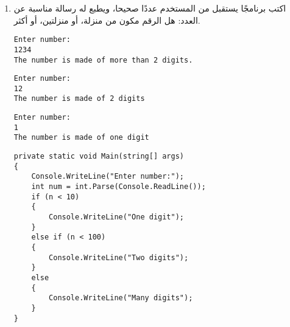 \documentclass[12pt, twoside]{article}
\begin{document}
\begin{enumerate}[itemsep=3em]
\begin{enumerate}
\item اكتب برنامجًا يستقبل من المستخدم عددًا صحيحا، ويطبع له رسالة مناسبة عن العدد: هل الرقم مكون من منزلة، أو منزلتين، أو أكثر.
\ifdetailed
\begin{boxExample}[1]
\begin{english}
\begin{verbatim}
Enter number:
1234
The number is made of more than 2 digits.
\end{verbatim}
\end{english}
\end{boxExample}
\begin{boxExample}[2]
\begin{english}
\begin{verbatim}
Enter number:
12
The number is made of 2 digits
\end{verbatim}
\end{english}
\end{boxExample}
\begin{boxExample}[3]
\begin{english}
\begin{verbatim}
Enter number:
1
The number is made of one digit
\end{verbatim}
\end{english}
\end{boxExample}

\ifwithsols
\begin{boxSolution}
\begin{english}
\begin{verbatim}
private static void Main(string[] args)
{
    Console.WriteLine("Enter number:");
    int num = int.Parse(Console.ReadLine());
    if (n < 10)
    {
        Console.WriteLine("One digit");
    }
    else if (n < 100)
    {
        Console.WriteLine("Two digits");
    }
    else
    {
        Console.WriteLine("Many digits");
    }
}
\end{verbatim}
\end{english}
\end{boxSolution}
\fi
\clearpage
\fi


\end{enumerate}
\end{enumerate}
\end{document}
